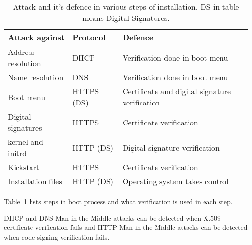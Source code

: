 \begin{table}[!ht]
  \def\arraystretch{1.1}%
  \begin{center}
    \begin{tabular}{| l | l | l |}
      \hline
      Attack against     & Protocol   & Defence                                        \\
      \hline
      Address resolution & DHCP       & Verification done in boot menu              \\
      Name resolution    & DNS        & Verification done in boot menu              \\
      Boot menu          & HTTPS (DS) & Certificate and digital signature verification \\
      Digital signatures & HTTPS      & Certificate verification                     \\
      kernel and initrd  & HTTP (DS)  & Digital signature verification               \\
      Kickstart          & HTTPS      & Certificate verification                     \\
      Installation files & HTTP (DS)  & Operating system takes control               \\
      \hline
    \end{tabular}
    \caption{Attack and it's defence in various steps of
      installation. DS in table means Digital
      Signatures.\label{tab:attack_and_defence}}
  \end{center}
\end{table}

Table~\ref{tab:attack_and_defence} lists steps in boot process and
what verification is used in each step.

DHCP and DNS Man-in-the-Middle attacks can be detected when X.509
certificate verification fails and HTTP Man-in-the-Middle attacks can
be detected when code signing verification fails.


